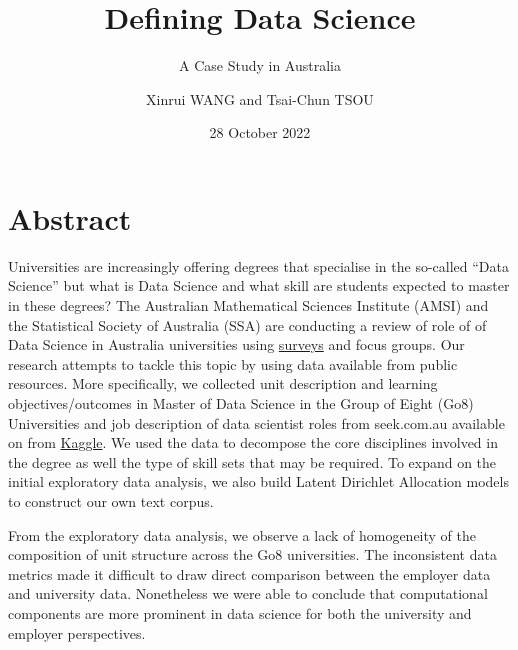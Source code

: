 \documentclass[
  letterpaper,
]{report}
\title{Defining Data Science}
\subtitle{A Case Study in Australia}
\author{Xinrui WANG and Tsai-Chun TSOU}
\date{28 October 2022}
\renewcommand*\contentsname{Table of contents}
\newcommand\contentsname{Table of contents}
\begin{document}
\maketitle
\ifdefined\Shaded\renewenvironment{Shaded}{\begin{tcolorbox}[sharp corners, boxrule=0pt, interior hidden, frame hidden, borderline west={3pt}{0pt}{shadecolor}, breakable, enhanced]}{\end{tcolorbox}}\fi

\renewcommand*\contentsname{Table of contents}
{
\hypersetup{linkcolor=}
\setcounter{tocdepth}{2}
\tableofcontents
}

\hypertarget{abstract}{%
\chapter*{Abstract}\label{abstract}}

Universities are increasingly offering degrees that specialise in the
so-called ``Data Science'' but what is Data Science and what skill are
students expected to master in these degrees? The Australian
Mathematical Sciences Institute (AMSI) and the Statistical Society of
Australia (SSA) are conducting a review of role of of Data Science in
Australia universities using
\href{https://amsi.org.au/amsi-ssa-data-science-review/}{surveys} and
focus groups. Our research attempts to tackle this topic by using data
available from public resources. More specifically, we collected unit
description and learning objectives/outcomes in Master of Data Science
in the Group of Eight (Go8) Universities and job description of data
scientist roles from seek.com.au available on from
\href{https://www.kaggle.com/code/nomilk/exploring-2-years-of-data-scientist-job-listings/data}{Kaggle}.
We used the data to decompose the core disciplines involved in the
degree as well the type of skill sets that may be required. To expand on
the initial exploratory data analysis, we also build Latent Dirichlet
Allocation models to construct our own text corpus.

From the exploratory data analysis, we observe a lack of homogeneity of
the composition of unit structure across the Go8 universities. The
inconsistent data metrics made it difficult to draw direct comparison
between the employer data and university data. Nonetheless we were able
to conclude that computational components are more prominent in data
science for both the university and employer perspectives.
\end{document}
